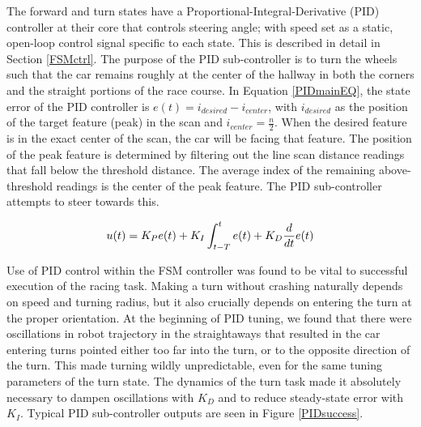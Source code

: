 \documentclass[letterpaper, 10 pt, conference]{ieeeconf}  %
\begin{document}
The forward and turn states have a Proportional-Integral-Derivative (PID) controller at their core that controls steering angle; with speed set as a static, open-loop control signal specific to each state. This is described in detail in Section \ref{FSMctrl}.  The purpose of the PID sub-controller is to turn the wheels such that the car remains roughly at the center of the hallway in both the corners and the straight portions of the race course.  In Equation \ref{PIDmainEQ}, the state error of the PID controller is $e(t) = i_{desired} - i_{center}$, with $i_{desired}$ as the position of the target feature (peak) in the scan and $i_{center} = \frac{n}{2}$.  When the desired feature is in the exact center of the scan, the car will be facing that feature.  The position of the peak feature is determined by filtering out the line scan distance readings that fall below the threshold distance.  The average index of the remaining above-threshold readings is the center of the peak feature.  The PID sub-controller attempts to steer towards this.

\begin{equation}
    u(t) = K_P e(t) + K_I \int_{t-T}^{t} e(t) + K_D { d \over dt } e(t) \label{PIDmainEQ}
\end{equation} 

Use of PID control within the FSM controller was found to be vital to successful execution of the racing task.  Making a turn without crashing naturally depends on speed and turning radius, but it also crucially depends on entering the turn at the proper orientation.  At the beginning of PID tuning, we found that there were oscillations in robot trajectory in the straightaways that resulted in the car entering turns pointed either too far into the turn, or to the opposite direction of the turn.  This made turning wildly unpredictable, even for the same tuning parameters of the turn state.  The dynamics of the turn task made it absolutely necessary to dampen oscillations with $K_D$ and to reduce steady-state error with $K_I$.  Typical PID sub-controller outputs are seen in Figure \ref{PIDsuccess}.
\end{document}
